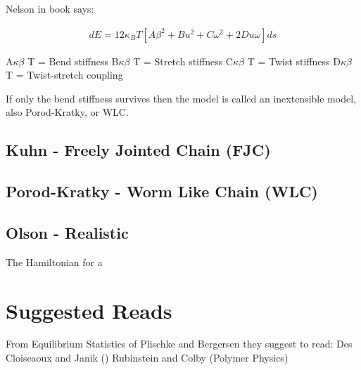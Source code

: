 Nelson in book says:

\begin{gather}
dE={1}{2}\kappa_{B}T[A\beta^2+Bu^2+C\omega^2+2Du\omega]ds
\end{gather}  

A$\kappa \beta$ T = Bend stiffness
B$\kappa \beta$ T = Stretch stiffness
C$\kappa \beta$ T = Twist stiffness
D$\kappa \beta$ T = Twist-stretch coupling

If only the bend stiffness survives then the model is called an
inextensible model, also Porod-Kratky, or WLC.

\subsection{Kuhn - Freely Jointed Chain (FJC)}

\subsection{Porod-Kratky - Worm Like Chain (WLC)}

\subsection{Olson - Realistic}

The Hamiltonian for a \cite{czapla2009}





\section{Suggested Reads}

From Equilibrium Statistics of Plischke and Bergersen they suggest to
read:
Des Cloiseaoux and Janik ()
Rubinstein and Colby (Polymer Physics)

